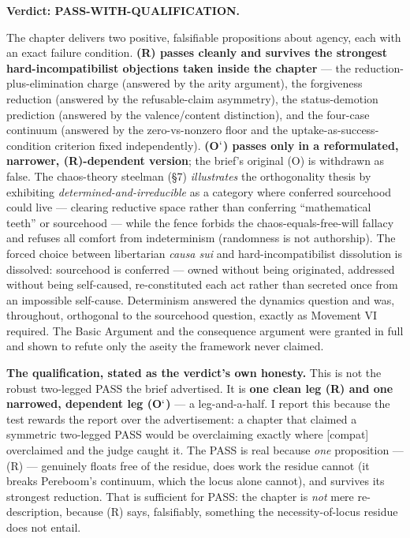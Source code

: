 \documentclass[11pt]{article}
\begin{document}
\textbf{Verdict: PASS-WITH-QUALIFICATION.}

The chapter delivers two positive, falsifiable propositions about agency, each with an exact failure condition. \textbf{(R) passes cleanly and survives the strongest hard-incompatibilist objections taken inside the chapter} — the reduction-plus-elimination charge (answered by the arity argument), the forgiveness reduction (answered by the refusable-claim asymmetry), the status-demotion prediction (answered by the valence/\allowbreak{}content distinction), and the four-case continuum (answered by the zero-vs-nonzero floor and the uptake-as-success-condition criterion fixed independently). \textbf{(O\ensuremath{`}) passes only in a reformulated, narrower, (R)-dependent version}; the brief's original (O) is withdrawn as false. The chaos-theory steelman (§7) \emph{illustrates} the orthogonality thesis by exhibiting \emph{determined-and-irreducible} as a category where conferred sourcehood could live — clearing reductive space rather than conferring ``mathematical teeth'' or sourcehood — while the fence forbids the chaos-equals-free-will fallacy and refuses all comfort from indeterminism (randomness is not authorship). The forced choice between libertarian \emph{causa sui} and hard-incompatibilist dissolution is dissolved: sourcehood is conferred — owned without being originated, addressed without being self-caused, re-constituted each act rather than secreted once from an impossible self-cause. Determinism answered the dynamics question and was, throughout, orthogonal to the sourcehood question, exactly as Movement VI required. The Basic Argument and the consequence argument were granted in full and shown to refute only the aseity the framework never claimed.

\textbf{The qualification, stated as the verdict's own honesty.} This is not the robust two-legged PASS the brief advertised. It is \textbf{one clean leg (R) and one narrowed, dependent leg (O\ensuremath{`})} — a leg-and-a-half. I report this because the test rewards the report over the advertisement: a chapter that claimed a symmetric two-legged PASS would be overclaiming exactly where [compat] overclaimed and the judge caught it. The PASS is real because \emph{one} proposition — (R) — genuinely floats free of the residue, does work the residue cannot (it breaks Pereboom's continuum, which the locus alone cannot), and survives its strongest reduction. That is sufficient for PASS: the chapter is \emph{not} mere re-description, because (R) says, falsifiably, something the necessity-of-locus residue does not entail.
\end{document}
